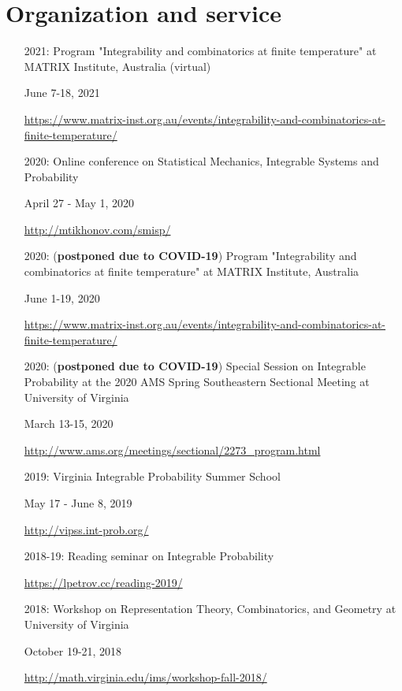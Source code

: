 \documentclass[letterpaper,11pt]{article}
\begin{document}
\section*{Organization and service}

\begin{itemize}
	\item [2021:]
		Program "Integrability and combinatorics at finite temperature"
		at MATRIX Institute, Australia
		(virtual)

		June 7-18, 2021

		\url{https://www.matrix-inst.org.au/events/integrability-and-combinatorics-at-finite-temperature/}
	\item [2020:]
		Online conference on Statistical Mechanics, Integrable Systems and Probability
		
		April 27 - May 1, 2020

		\url{http://mtikhonov.com/smisp/}
	\item [2020:]
	(\textbf{postponed due to COVID-19})
		Program "Integrability and combinatorics at finite temperature"
		at MATRIX Institute,
		Australia

		June 1-19, 2020

		\url{https://www.matrix-inst.org.au/events/integrability-and-combinatorics-at-finite-temperature/}
	\item [2020:]
	(\textbf{postponed due to COVID-19})
		Special Session on Integrable Probability
		at the 2020 AMS Spring Southeastern Sectional Meeting at 
		University of Virginia
		
		March 13-15, 2020

		\url{http://www.ams.org/meetings/sectional/2273_program.html}

	\item [2019:]
		Virginia Integrable Probability Summer School
		
		May 17 - June 8, 2019

		\url{http://vipss.int-prob.org/}

	\item[2018-19:]
	      Reading seminar on Integrable Probability

	      \url{https://lpetrov.cc/reading-2019/}
		
	\item [2018:]
		Workshop on Representation Theory, Combinatorics, and Geometry
		at University of
		Virginia
		
		October 19-21, 2018
	
		\url{http://math.virginia.edu/ims/workshop-fall-2018/}


\end{itemize}
\end{document}
